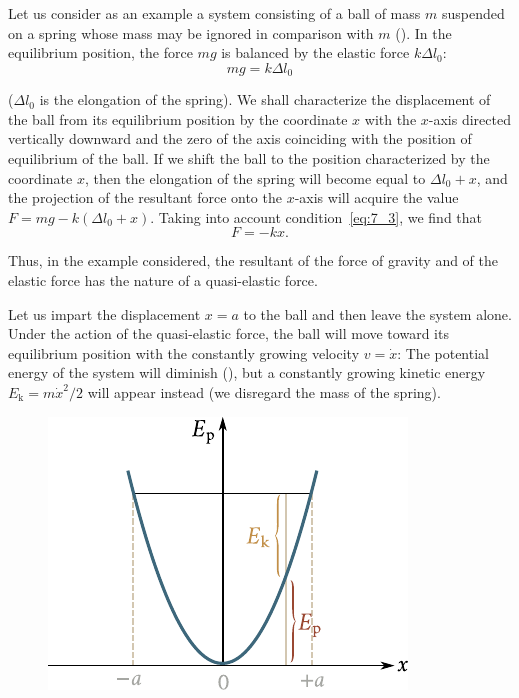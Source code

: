 Let us consider as an example a system consisting of a ball of mass $m$ suspended on a spring whose mass may be ignored in comparison with $m$ (). In the equilibrium position, the force $mg$ is balanced by the elastic force $k\Delta l_0$:
\begin{equation}\label{eq:7_3}
	mg = k\Delta l_0
\end{equation}

\noindent
($\Delta l_0$ is the elongation of the spring). We shall characterize the displacement of the ball from its equilibrium position by the coordinate $x$ with the $x$-axis directed vertically downward and the zero of the axis coinciding with the position of equilibrium of the ball. If we shift the ball to the position characterized by the coordinate $x$, then the elongation of the spring will become equal to $\Delta l_0+x$, and the projection of the resultant force onto the $x$-axis will acquire the value $F=mg-k(\Delta l_0+x)$. Taking into account condition~\eqref{eq:7_3}, we find that
\begin{equation}\label{eq:7_4}
	F = -kx.
\end{equation}

\noindent
Thus, in the example considered, the resultant of the force of gravity and of the elastic force has the nature of a quasi-elastic force.

Let us impart the displacement $x=a$ to the ball and then leave the system alone. Under the action of the quasi-elastic force, the ball will move toward its equilibrium position with the constantly growing velocity $v=\dot{x}$: The potential energy of the system will diminish (), but a constantly growing kinetic energy $E_{\text{k}}=m\dot{x}^2/2$ will appear instead (we disregard the mass of the spring).

\begin{figure}[t]
	\begin{center}
		\includegraphics[scale=0.95]{figures/ch_07/fig_7_2.pdf}
		\caption[]{}
		\label{fig:7_2}
	\end{center}
	\vspace{-0.7cm}
\end{figure}

